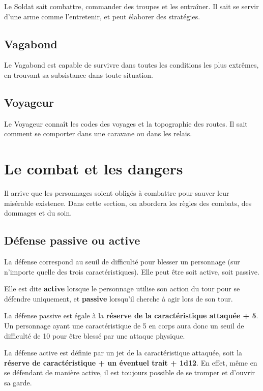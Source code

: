 \documentclass[a4paper,10pt,twoside,twocolumn,openany,bg=print,justified]{dndbook}
\begin{document}
Le Soldat sait combattre, commander des troupes et les entraîner. Il sait se servir d'une arme comme l'entretenir, et peut élaborer des stratégies.

\section*{Vagabond}

Le Vagabond est capable de survivre dans toutes les conditions les plus extrêmes, en trouvant sa subsistance dans toute situation.

\section*{Voyageur}

Le Voyageur connaît les codes des voyages et la topographie des routes. Il sait comment se comporter dans une caravane ou dans les relais.

\newpage

\chapter{Le combat et les dangers}

Il arrive que les personnages soient obligés à combattre pour sauver leur misérable existence. Dans cette section, on abordera les règles des combats, des dommages et du soin.

\section{Défense passive ou active}

La défense correspond au seuil de difficulté pour blesser un personnage (sur n'importe quelle des trois caractéristiques). Elle peut être soit active, soit passive.

Elle est dite \textbf{active} lorsque le personnage utilise son action du tour pour se défendre uniquement, et \textbf{passive} lorsqu'il cherche à agir lors de son tour.

La défense passive est égale à la \textbf{réserve de la caractéristique attaquée + 5}. Un personnage ayant une caractéristique de 5 en corps aura donc un seuil de difficulté de 10 pour être blessé par une attaque physique.

La défense active est définie par un jet de la caractéristique attaquée, soit la \textbf{réserve de caractéristique + un éventuel trait + 1d12}. En effet, même en se défendant de manière active, il est toujours possible de se tromper et d'ouvrir sa garde.
\end{document}
